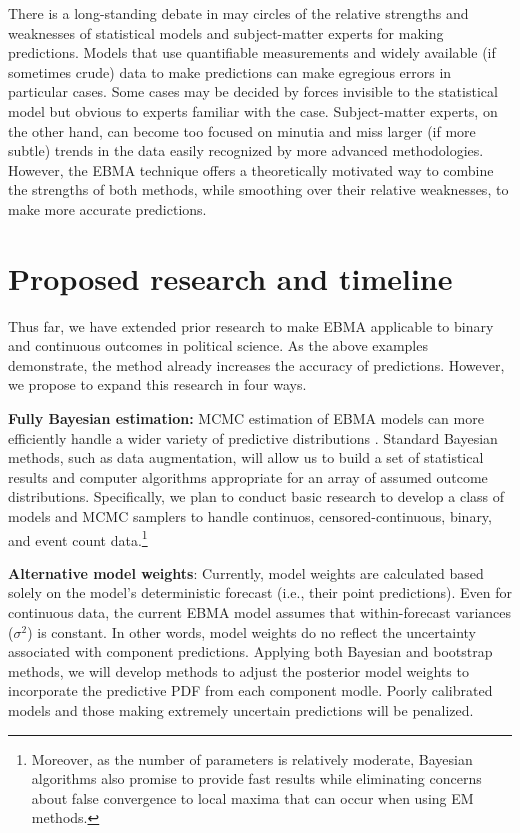 \documentclass[pdftex,12pt,fullpage,oneside]{amsart}
\begin{document}
There is a long-standing debate in may circles of the relative
strengths and weaknesses of statistical models and subject-matter experts for
making predictions.  Models that use quantifiable measurements and
widely available (if sometimes crude) data to make
predictions can make egregious errors in particular cases.  Some cases
may be decided by forces invisible to the
statistical model but obvious to experts familiar with the case.
Subject-matter experts, on the other hand, can become too focused on
minutia and miss larger (if more subtle) trends in the data
easily recognized by more advanced methodologies.  However, the EBMA
technique offers a theoretically motivated way to combine the
strengths of both methods, while smoothing over their relative
weaknesses, to make more accurate predictions.

\section{Proposed research and timeline}

Thus far, we have extended prior research to make EBMA applicable to
binary and continuous outcomes in political science.  As the above
examples demonstrate, the method already increases the accuracy of
predictions.  However, we propose to expand this research in four
ways.

\textbf{Fully Bayesian estimation:} MCMC estimation of EBMA models can
more efficiently handle a wider variety of predictive distributions
\citep{Vrugt:2008}.  Standard Bayesian methods, such as data
augmentation, will allow us to build a set of statistical results and
computer algorithms appropriate for an array of assumed outcome
distributions.  Specifically, we plan to conduct basic research to
develop a class of models and MCMC samplers to handle continuos,
censored-continuous, binary, and event count data.\footnote{Moreover,
  as the number of parameters is relatively moderate, Bayesian
  algorithms also promise to provide fast results while eliminating
  concerns about false convergence to local maxima that can occur when
  using EM methods.}

\textbf{Alternative model weights}: Currently, model weights are
calculated based solely on the model's deterministic forecast (i.e.,
their point predictions). Even for continuous data, the current EBMA
model assumes that within-forecast variances ($\sigma^2$) is constant.
In other words, model weights do no reflect the uncertainty associated
with component predictions.  Applying both Bayesian and bootstrap
methods, we will develop methods to adjust the posterior model weights
to incorporate the predictive PDF from each component modle.  Poorly
calibrated models and those making extremely uncertain predictions
will be penalized.
\end{document}
